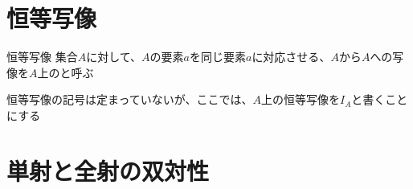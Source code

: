 \documentclass[b5paper,12pt]{jsarticle}
\begin{document}
\sectionline
\section{恒等写像}

\begin{definition}{恒等写像}
  集合$A$に対して、$A$の要素$a$を同じ要素$a$に対応させる、$A$から$A$への写像を$A$上のと呼ぶ
\end{definition}

恒等写像の記号は定まっていないが、ここでは、$A$上の恒等写像を$I_A$と書くことにする

\sectionline
\section{単射と全射の双対性}
\end{document}
